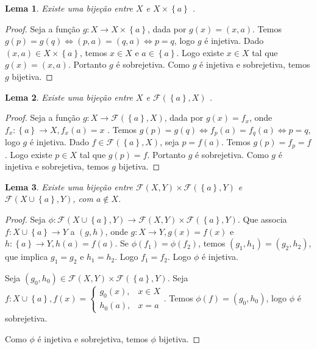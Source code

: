 \documentclass{article}
\theoremstyle{plain}
\newtheorem{lema}{Lema}
\theoremstyle{definition}
\theoremstyle{remark}
\begin{document}
\begin{lema}
	Existe uma bijeção entre $X$ e  $X \times \left\{ a\right\}$ .
\end{lema}
\begin{proof}
	Seja a função $g: X  \to  X \times \left\{a\right\}$, dada por $g(x) = (x,a)$. Temos $g(p) = g(q) \iff (p,a) = (q,a) \iff p = q $, logo $g$ é injetiva. Dado $(x,a) \in X \times \left\{ a\right\}$, temos $x\in X$ e $a\in \left\{a\right\}$. Logo existe $x\in X$ tal que $g(x) = (x,a) $. Portanto $g$ é sobrejetiva. Como $g$ é injetiva e sobrejetiva, temos  $g$  bijetiva.
\end{proof}
\begin{lema}
	Existe uma bijeção entre $X$ e  $\mathcal{F}(\left\{a\right\}, X )$ .
\end{lema}
\begin{proof}
	Seja a função $g: X  \to  \mathcal{F}( \left\{a\right\}, X )$, dada por $g(x) = f_x$, onde $f_x: \left\{ a\right\} \to X, f_x(a) = x$ . Temos $g(p) = g(q) \iff f_p(a) = f_q(a) \iff p = q $, logo $g$ é injetiva. Dado $f \in \mathcal{F}( \left\{ a\right\}, X)$, seja $p = f(a)$. Temos $g(p) = f_p = f$. Logo existe $p\in X$ tal que $g(p) = f $. Portanto $g$ é sobrejetiva. Como $g$ é injetiva e sobrejetiva, temos  $g$  bijetiva.
\end{proof}
\begin{lema}
	Existe uma bijeção entre $\mathcal{F}(X  , Y )\times \mathcal{F}( \left\{ a \right\} , Y ) $ e  $\mathcal{F}(X \cup \left\{ a \right\} , Y )$, com $a\not \in X$.
\end{lema}
\begin{proof}
	Seja $\phi: \mathcal{F}(X \cup \left\{ a \right\} , Y ) \to \mathcal{F}(X  , Y )\times \mathcal{F}( \left\{ a \right\} , Y ) $. Que associa $f: X\cup \left\{a\right\} \to Y$ a $(g,h)$, onde $g: X\to Y, g(x) = f(x)$ e $h: \left\{a\right\} \to Y, h(a) = f(a)$. Se $\phi(f_1) = \phi(f_2)$, temos $(g_1, h_1) = (g_2, h_2)$, que implica $g_1 = g_2$ e $h_1 = h_2$. Logo $f_1 = f_2$. Logo $\phi$ é injetiva. 

	Seja $(g_0,h_0) \in \mathcal{F}(X  , Y )\times \mathcal{F}( \left\{ a \right\} , Y ) $. Seja $f: X\cup \left\{a\right\}, f(x) = \begin{cases} g_0(x), & x\in X \\ h_0(a), &x= a \end{cases}$. Temos $\phi(f)  = (g_0,h_0)$, logo $\phi$ é sobrejetiva.

		Como $\phi$ é injetiva e sobrejetiva, temos $\phi$ bijetiva.
\end{proof}
\end{document}
